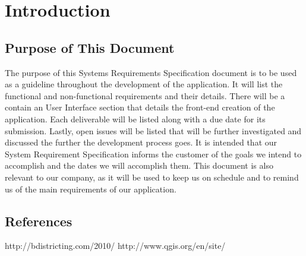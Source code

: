 \documentclass{article}
\begin{document}
\tableofcontents
\thispagestyle{empty}
\cleardoublepage

\setcounter{page}{1}



\section{Introduction}\label{sec:intro}


\subsection{Purpose of This Document}

\vspace{2.5mm}

\begin{addmargin}[4em]{0em}

The purpose of this Systems Requirements Specification document is to be used as a guideline throughout the development of the application. It will list the functional and non-functional requirements and their details. There will be a contain an User Interface section that details the front-end creation of the application. Each deliverable will be listed along with a due date for its submission. Lastly, open issues will be listed that will be further investigated and discussed the further the development process goes. It is intended that our System Requirement Specification informs the customer of the goals we intend to accomplish and the dates we will accomplish them. This document is also relevant to our company, as it will be used to keep us on schedule and to remind us of the main requirements of our application.

\end{addmargin}

\vspace{2.5mm}


\subsection{References}

\vspace{2.5mm}

\begin{addmargin}[4em]{0em}

http://bdistricting.com/2010/
http://www.qgis.org/en/site/

\end{addmargin}
\end{document}
